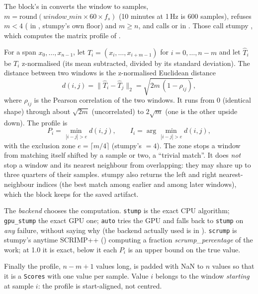 The block's  in  converts the window to
samples, $m = \mathrm{round}(\textit{window\_min} \times 60 \times f_s)$ (10 minutes at 1\,Hz is
600 samples), refuses $m < 4$ ( in , stumpy's
own floor) and $m \geq n$, and calls  or  in
. Those call stumpy
\citep{law2019stumpy}, which computes the matrix profile of \citet{yeh2016matrix}.

For a span $x_0,\dots,x_{n-1}$, let $T_i = (x_i,\dots,x_{i+m-1})$ for $i = 0,\dots,n-m$ and let
$\hat T_i$ be $T_i$ z-normalised (its mean subtracted, divided by its standard deviation). The
distance between two windows is the z-normalised Euclidean distance
\[ d(i,j) = \lVert \hat T_i - \hat T_j \rVert_2 = \sqrt{2m\,(1 - \rho_{ij})}, \]
where $\rho_{ij}$ is the Pearson correlation of the two windows. It runs from 0 (identical shape)
through about $\sqrt{2m}$ (uncorrelated) to $2\sqrt{m}$ (one is the other upside down). The
profile is
\[ P_i = \min_{\,|i-j| > e} d(i,j), \qquad I_i = \arg\min_{\,|i-j| > e} d(i,j), \]
with the exclusion zone $e = \lceil m/4 \rceil$ (stumpy's  $= 4$).
The zone stops a window from matching itself shifted by a sample or two, a ``trivial match''. It
does \emph{not} stop a window and its nearest neighbour from overlapping: they may share up to
three quarters of their samples. stumpy also returns the left and right nearest-neighbour
indices (the best match among earlier and among later windows), which the block keeps for the
saved artifact.

The \emph{backend} chooses the computation. \texttt{stump} is the exact CPU algorithm;
\texttt{gpu\_stump} the exact GPU one; \texttt{auto} tries the GPU and falls back to
\texttt{stump} on \emph{any} failure, without saying why (the backend actually used is in
). \texttt{scrump} is stumpy's anytime SCRIMP++ () computing a
fraction \emph{scrump\_percentage} of the work; at 1.0 it is exact, below it each $P_i$ is an upper
bound on the true value.

Finally the profile, $n-m+1$ values long, is padded with NaN to $n$ values so that it is a
\texttt{Scores} with one value per sample. Value $i$ belongs to the window \emph{starting} at
sample $i$: the profile is start-aligned, not centred.

